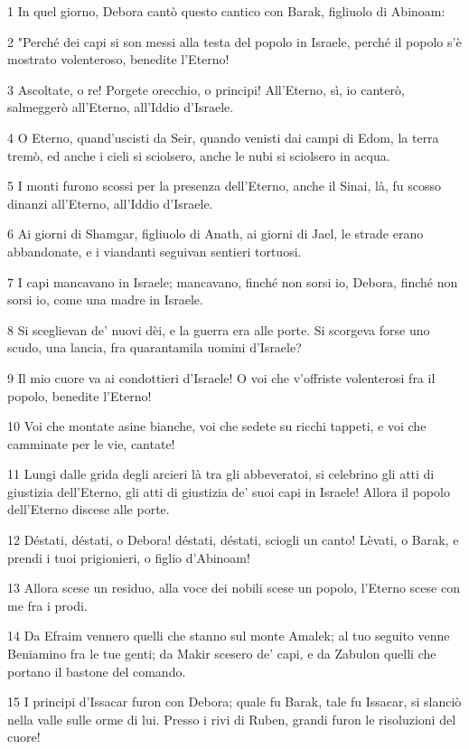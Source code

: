 \par 1 In quel giorno, Debora cantò questo cantico con Barak, figliuolo di Abinoam:
\par 2 "Perché dei capi si son messi alla testa del popolo in Israele, perché il popolo s'è mostrato volenteroso, benedite l'Eterno!
\par 3 Ascoltate, o re! Porgete orecchio, o principi! All'Eterno, sì, io canterò, salmeggerò all'Eterno, all'Iddio d'Israele.
\par 4 O Eterno, quand'uscisti da Seir, quando venisti dai campi di Edom, la terra tremò, ed anche i cieli si sciolsero, anche le nubi si sciolsero in acqua.
\par 5 I monti furono scossi per la presenza dell'Eterno, anche il Sinai, là, fu scosso dinanzi all'Eterno, all'Iddio d'Israele.
\par 6 Ai giorni di Shamgar, figliuolo di Anath, ai giorni di Jael, le strade erano abbandonate, e i viandanti seguivan sentieri tortuosi.
\par 7 I capi mancavano in Israele; mancavano, finché non sorsi io, Debora, finché non sorsi io, come una madre in Israele.
\par 8 Si sceglievan de' nuovi dèi, e la guerra era alle porte. Si scorgeva forse uno scudo, una lancia, fra quarantamila uomini d'Israele?
\par 9 Il mio cuore va ai condottieri d'Israele! O voi che v'offriste volenterosi fra il popolo, benedite l'Eterno!
\par 10 Voi che montate asine bianche, voi che sedete su ricchi tappeti, e voi che camminate per le vie, cantate!
\par 11 Lungi dalle grida degli arcieri là tra gli abbeveratoi, si celebrino gli atti di giustizia dell'Eterno, gli atti di giustizia de' suoi capi in Israele! Allora il popolo dell'Eterno discese alle porte.
\par 12 Déstati, déstati, o Debora! déstati, déstati, sciogli un canto! Lèvati, o Barak, e prendi i tuoi prigionieri, o figlio d'Abinoam!
\par 13 Allora scese un residuo, alla voce dei nobili scese un popolo, l'Eterno scese con me fra i prodi.
\par 14 Da Efraim vennero quelli che stanno sul monte Amalek; al tuo seguito venne Beniamino fra le tue genti; da Makir scesero de' capi, e da Zabulon quelli che portano il bastone del comando.
\par 15 I principi d'Issacar furon con Debora; quale fu Barak, tale fu Issacar, si slanciò nella valle sulle orme di lui. Presso i rivi di Ruben, grandi furon le risoluzioni del cuore!
